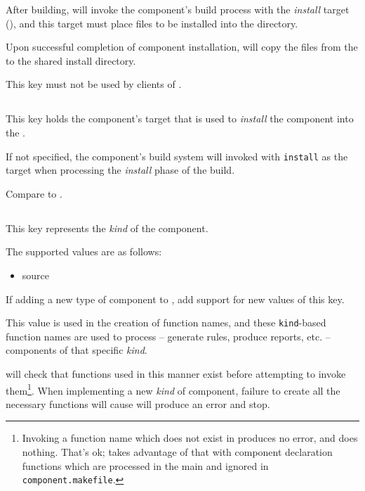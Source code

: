 After building, \lmsbw will invoke the component's build process with
the \emph{install} target (), and this
target must place files to be installed into the \destdir directory.

Upon successful completion of component installation, \lmsbw will copy
the files from the \destdir to the shared install directory.

This key must not be used by clients of \lmsbw.


\subsection{}\label{variables:install-target}

This key holds the component's \makefile target that is used to
\emph{install} the component into the \destdir.

If not specified, the component's build system will invoked with
\texttt{install} as the target when processing the \emph{install}
phase of the build.

Compare to .


\subsection{}\label{variables:kind}

This key represents the \emph{kind} of the component.

The supported values are as follows:

\begin{itemize}
\item source
\end{itemize}

If adding a new type of component to \lmsbw, add support for new
values of this key.

This value is used in the creation of function names, and these
\texttt{kind}-based function names are used to process -- generate
rules, produce reports, etc. -- components of that specific
\emph{kind}.

\lmsbw will check that functions used in this manner exist before
attempting to invoke them\footnote{Invoking a function name which does
  not exist in \gnumake produces no error, and does nothing.  That's
  ok; \lmsbw takes advantage of that with component declaration
  functions which are processed in the main \makefile and ignored in
  \texttt{component.makefile}.}.  When implementing a new \emph{kind}
of component, failure to create all the necessary functions will cause
\lmsbw will produce an error and stop.

